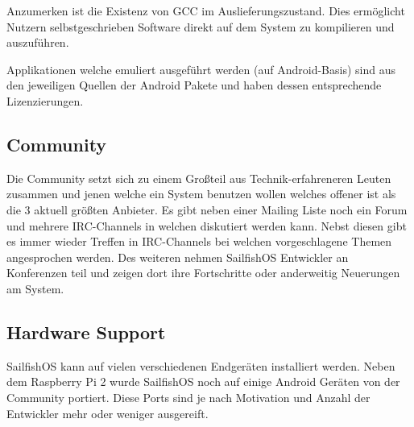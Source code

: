 Anzumerken ist die Existenz von GCC im Auslieferungszustand. Dies ermöglicht Nutzern selbstgeschrieben Software direkt auf dem System zu kompilieren\cite{online:sailfish-list-licenses} und auszuführen.

Applikationen welche emuliert ausgeführt werden (auf Android-Basis) sind aus den jeweiligen Quellen der Android Pakete und haben dessen entsprechende Lizenzierungen.\\

\subsection{Community}
Die Community setzt sich zu einem Großteil aus Technik-erfahreneren Leuten zusammen und jenen welche ein System benutzen wollen welches offener ist als die 3 aktuell größten Anbieter. Es gibt neben einer Mailing Liste noch ein Forum und mehrere IRC-Channels\cite{online:sailfish-communitygeneral} in welchen diskutiert werden kann. Nebst diesen gibt es immer wieder Treffen in IRC-Channels bei welchen vorgeschlagene Themen angesprochen werden. Des weiteren nehmen SailfishOS Entwickler an Konferenzen teil und zeigen dort ihre Fortschritte oder anderweitig Neuerungen am System.\\
\iffalse
\subsubsection{Developer Support}
\cite{online:jolla-store-terms}
https://harbour.jolla.com/\\
https://github.com/sailfishos\\
https://talk.maemo.org/showthread.php?t=92852\\
http://talk.maemo.org/showthread.php?p=1482661\#post1482661\\
https://github.com/maliit\\
https://talk.maemo.org/showthread.php?t=92036\\
\fi

\subsection{Hardware Support}
\mbox{SailfishOS} kann auf vielen verschiedenen Endgeräten installiert werden. Neben dem Raspberry Pi 2\cite{online:sailfish-rpi2} wurde \mbox{SailfishOS} noch auf einige Android Geräten von der Community\cite{online:sailfish-android-port} portiert. Diese Ports sind je nach Motivation und Anzahl der Entwickler mehr oder weniger ausgereift\cite{online:sailfish-porters}.

